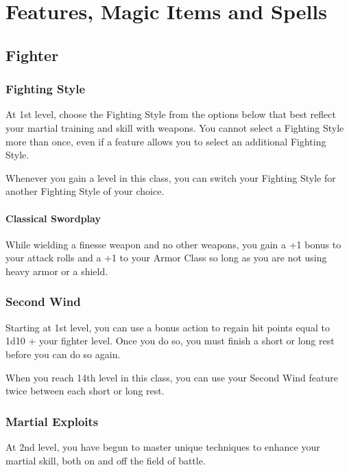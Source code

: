\documentclass[letterpaper,justified,openany,oneside,twocolumn]{dndbook}
\begin{document}
\onecolumn


\rendercharactersheet

\renderbackgroundsheet




\restoregeometry
\twocolumn

\chapter*{Features, Magic Items and Spells}

\section*{Fighter}
\subsection*{Fighting Style}
At 1st level, choose the Fighting Style from the options below that best reflect your martial training and skill with weapons. You cannot select a Fighting Style more than once, even if a feature allows you to select an additional Fighting Style.

Whenever you gain a level in this class, you can switch your Fighting Style for another Fighting Style of your choice.
\subsubsection*{Classical Swordplay}
While wielding a finesse weapon and no other weapons, you gain a +1 bonus to your attack rolls and a +1 to your Armor Class so long as you are not using heavy armor or a shield.

\subsection*{Second Wind}
Starting at 1st level, you can use a bonus action to regain hit points equal to 1d10 + your fighter level. Once you do so, you must finish a short or long rest before you can do so again.

When you reach 14th level in this class, you can use your Second Wind feature twice between each short or long rest.

\subsection*{Martial Exploits}
At 2nd level, you have begun to master unique techniques to enhance your martial skill, both on and off the field of battle.
\end{document}
